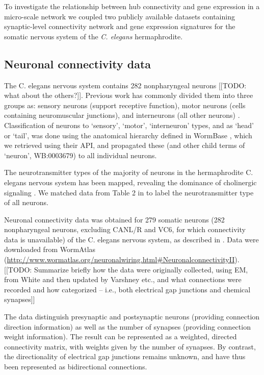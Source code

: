 \documentclass[10pt,letterpaper]{article}
\begin{document}
To investigate the relationship between hub connectivity and gene expression in a micro-scale network we coupled two publicly available datasets containing synaptic-level connectivity network and gene expression signatures for the somatic nervous system of the \textit{C. elegans} hermaphrodite.

\subsection*{Neuronal connectivity data}

The C. elegans nervous system contains 282 nonpharyngeal neurons [[TODO: what about the others?]].
Previous work has commonly divided them into three groups as:
sensory neurons (support receptive function),
motor neurons (cells containing neuromuscular junctions),
and interneurons (all other neurons) \cite{White:1986tx}.
Classification of neurons to `sensory', `motor', `interneuron' types, and as `head' or `tail', was done using the anatomical hierarchy defined in WormBase \cite{Harris:2009kd}, which we retrieved using their API, and propagated these (and other child terms of `neuron', WB:0003679) to all individual neurons. %

The neurotransmitter types of the majority of neurons in the hermaphrodite C. elegans nervous system has been mapped, revealing the dominance of cholinergic signaling \cite{Pereira:2015er}.
We matched data from Table 2 in \citet{Pereira:2015er} to label the neurotransmitter type of all neurons.

Neuronal connectivity data was obtained for 279 somatic neurons (282 nonpharyngeal neurons, excluding CANL/R and VC6, for which connectivity data is unavailable) of the C. elegans nervous system, as described in \citet{Varshney2011}.
Data were downloaded from WormAtlas (\url{http://www.wormatlas.org/neuronalwiring.html#NeuronalconnectivityII}).
[[TODO: Summarize briefly how the data were originally collected, using EM, from White and then updated by Varshney etc., and what connections were recorded and how categorized -- i.e., both electrical gap junctions and chemical synapses]]

The data distinguish presynaptic and postsynaptic neurons (providing connection direction information) as well as the number of synapses (providing connection weight information).
The result can be represented as a weighted, directed connectivity matrix, with weights given by the number of synapses.
By contrast, the directionality of electrical gap junctions remains unknown, and have thus been represented as bidirectional connections.
\end{document}
